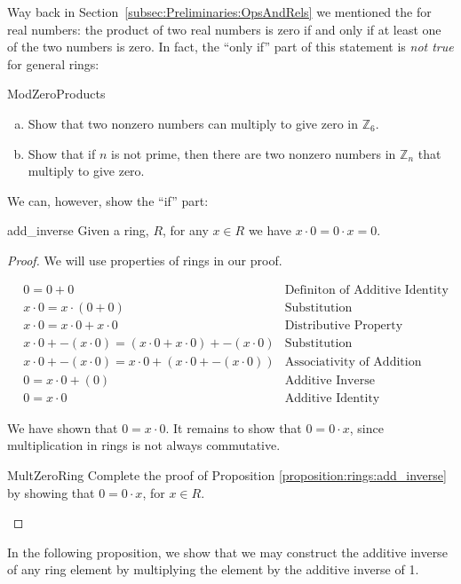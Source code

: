 Way back in Section~\ref{subsec:Preliminaries:OpsAndRels} we mentioned the  for real numbers: the product of two real numbers is zero if and only if at least one of the two numbers is zero. In fact, the ``only if'' part of this statement is \emph{not true} for general rings:

\begin{exercise}{ModZeroProducts}
\begin{enumerate}[(a)]
\item Show that two nonzero numbers can multiply to give zero in ${\mathbb Z}_6$.
\item Show that if $n$ is not prime, then there are two nonzero numbers in ${\mathbb Z}_n$ that multiply to give zero.
\end{enumerate}
\end{exercise}
We can, however, show the ``if'' part:

\begin{prop}{add_inverse}
Given a ring, $R$, for any $x\in R$ we have $x\cdot0=0\cdot x=0$.

\begin{proof}
We will use properties of rings in our proof.

\begin{align*}
&0=0+0 & \text{Definiton of Additive Identity}\\
&x\cdot0=x\cdot(0+0) & \text{Substitution}\\
&x\cdot0=x\cdot0+x\cdot0 & \text{Distributive Property}\\
&x\cdot0+-(x\cdot0)=(x\cdot0+x\cdot0)+-(x\cdot0) & \text{Substitution}\\
&x\cdot0+-(x\cdot0)=x\cdot0+(x\cdot0+-(x\cdot0)) & \text{Associativity of Addition}\\
&0=x\cdot0+(0) & \text{Additive Inverse}\\
&0=x\cdot0 & \text{Additive Identity}
\end{align*}

We have shown that $0=x\cdot0$. It remains to show that $0=0\cdot x$, since multiplication in rings is not always commutative.

\begin{exercise}{MultZeroRing}
Complete the proof of Proposition \ref{proposition:rings:add_inverse} by showing that $0=0\cdot x$, for $x\in R$.
\end{exercise}
\end{proof}
\end{prop}
In the following proposition, we show that we may construct the additive inverse of any ring element by multiplying the element by the additive inverse of 1.

